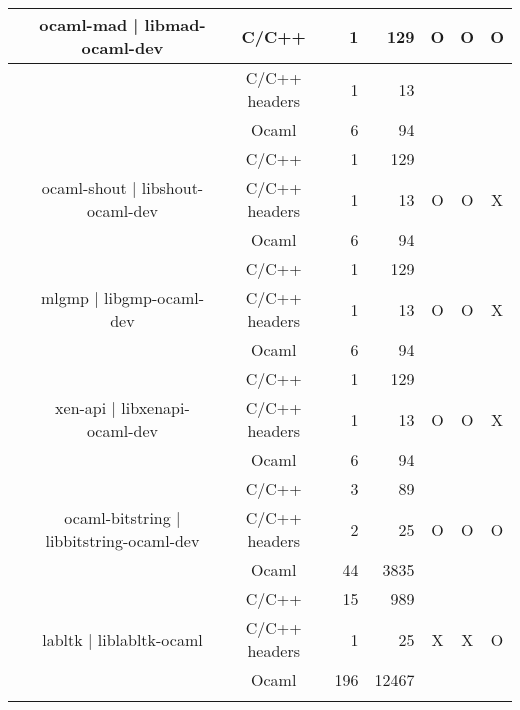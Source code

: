 \documentclass[11pt,a4paper]{article}
\begin{document}
 \begin{table}[h,t] 
\begin{tabular}{|>{\centering}m{3cm}| c|c|r|r| c| c|c|}
\hline


 \multirow{18}{3cm}{bindings with C libraries}&\multirow{3}{3cm}{ocaml-mad | libmad-ocaml-dev} & C/C++ & 1 & 129 & \multirow{3}{*}{O} & \multirow{3}{*}{O} & \multirow{3}{*}{O}\\
\cline{3-5}
& &                           C/C++ headers & 1 & 13 & & & \\
\cline{3-5}
& &                          Ocaml & 6 & 94 & & & \\
\cline{2-8}



 &\multirow{3}{3cm}{ocaml-shout | libshout-ocaml-dev} & C/C++ & 1 & 129 & \multirow{3}{*}{O} & \multirow{3}{*}{O} & \multirow{3}{*}{X}\\
\cline{3-5}
& &                           C/C++ headers & 1 & 13 & & & \\
\cline{3-5}
& &                          Ocaml & 6 & 94 & & & \\
\cline{2-8}

 &\multirow{3}{3cm}{mlgmp | libgmp-ocaml-dev} & C/C++ & 1 & 129 & \multirow{3}{*}{O} & \multirow{3}{*}{O} & \multirow{3}{*}{X}\\
\cline{3-5}
& &                           C/C++ headers & 1 & 13 & & & \\
\cline{3-5}
& &                          Ocaml & 6 & 94 & & & \\
\cline{2-8}


 &\multirow{3}{3cm}{xen-api | libxenapi-ocaml-dev} & C/C++ & 1 & 129 & \multirow{3}{*}{O} & \multirow{3}{*}{O} & \multirow{3}{*}{X}\\
\cline{3-5}
& &                           C/C++ headers & 1 & 13 & & & \\
\cline{3-5}
& &                          Ocaml & 6 & 94 & & & \\
\cline{2-8}
  & \multirow{3}{3cm}{ocaml-bitstring | libbitstring-ocaml-dev } & C/C++ & 3 & 89 & \multirow{3}{*}{O} & \multirow{3}{*}{O} & \multirow{3}{*}{O}\\
 \cline{3-5}
 & &                           C/C++ headers & 2 & 25 & & & \\
 \cline{3-5}
 & &                          Ocaml & 44& 3835 & & & \\
 \cline{2-8}


 &\multirow{3}{3cm}{labltk | liblabltk-ocaml} & C/C++ & 15 & 989 & \multirow{3}{*}{X} & \multirow{3}{*}{X} & \multirow{3}{*}{O}\\
 \cline{3-5}
 & &                           C/C++ headers & 1 & 25 & & & \\
 \cline{3-5}
 & &                          Ocaml & 196 & 12467 & & & \\
 \cline{2-8}


\end{tabular}
\end{table}
\end{document}
